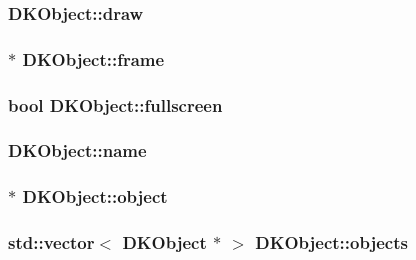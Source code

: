 \hypertarget{class_d_k_object_aec9a7c6780b18134a4b99d63974d6571}{
\subsubsection[{draw}]{ D\-K\-Object\-::draw}}\label{class_d_k_object_aec9a7c6780b18134a4b99d63974d6571}
\hypertarget{class_d_k_object_a52dfad9f7600a7ac9ab3045eee97c4b4}{
\subsubsection[{frame}]{$\ast$ D\-K\-Object\-::frame}}\label{class_d_k_object_a52dfad9f7600a7ac9ab3045eee97c4b4}
\hypertarget{class_d_k_object_a83b285f0b3d452fc15ad0ec4a5a4828f}{
\subsubsection[{fullscreen}]{\setlength{\rightskip}{0pt plus 5cm}bool D\-K\-Object\-::fullscreen\hspace{0.3cm}{\ttfamily [static]}}}\label{class_d_k_object_a83b285f0b3d452fc15ad0ec4a5a4828f}
\hypertarget{class_d_k_object_a410e025d19c0ca7cec054bd76fd11ee7}{
\subsubsection[{name}]{ D\-K\-Object\-::name}}\label{class_d_k_object_a410e025d19c0ca7cec054bd76fd11ee7}
\hypertarget{class_d_k_object_a1aac9df146f508fcb8f4e6a8183cc6c1}{
\subsubsection[{object}]{$\ast$ D\-K\-Object\-::object}}\label{class_d_k_object_a1aac9df146f508fcb8f4e6a8183cc6c1}
\hypertarget{class_d_k_object_af07b93de3d6f95f00f38cb1ead4d38f9}{
\subsubsection[{objects}]{\setlength{\rightskip}{0pt plus 5cm}std\-::vector$<$ {\bf D\-K\-Object} $\ast$ $>$ D\-K\-Object\-::objects\hspace{0.3cm}{\ttfamily [static]}}}\label{class_d_k_object_af07b93de3d6f95f00f38cb1ead4d38f9}
